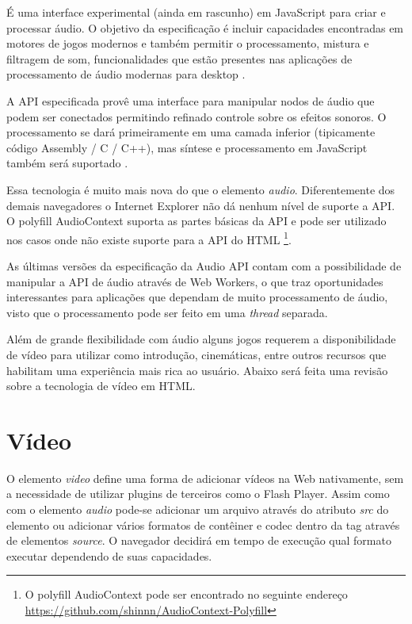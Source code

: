 É uma interface experimental (ainda em rascunho) em JavaScript para
criar e processar áudio. O objetivo da especificação é incluir
capacidades encontradas em motores de jogos modernos e também permitir
o processamento, mistura e filtragem de som, funcionalidades que estão
presentes nas aplicações de processamento de áudio modernas para
desktop \autocite{audioApiSpec}.

A API especificada provê uma interface para manipular nodos de
áudio que podem ser conectados permitindo refinado controle sobre os
efeitos sonoros. O processamento se dará primeiramente em uma camada
inferior (tipicamente código Assembly / C / C++), mas síntese e
processamento em JavaScript também será suportado \autocite{audioApiSpec}.

Essa tecnologia é muito mais nova do que o elemento \textit{audio}.
Diferentemente dos demais navegadores o Internet Explorer não
dá nenhum nível de suporte a API. O polyfill AudioContext
suporta as partes básicas da API e pode ser utilizado nos
casos onde não existe suporte para a API do HTML \footnote{O
polyfill AudioContext pode ser encontrado no seguinte endereço
\url{https://github.com/shinnn/AudioContext-Polyfill}}.

As últimas versões da especificação da Audio API contam com a
possibilidade de manipular a API de áudio através de Web Workers, o
que traz oportunidades interessantes para aplicações que dependam de
muito processamento de áudio, visto que o processamento pode ser
feito em uma \textit{thread} separada.

Além de grande flexibilidade com áudio alguns jogos requerem a
disponibilidade de vídeo para utilizar como introdução, cinemáticas,
entre outros recursos que habilitam uma experiência mais rica ao
usuário. Abaixo será feita uma revisão sobre a tecnologia de vídeo
em HTML.

\section{Vídeo}

O elemento \textit{video} define uma forma de adicionar vídeos na
Web nativamente, sem a necessidade de utilizar plugins de terceiros
como o Flash Player. Assim como com o elemento \textit{audio} pode-se
adicionar um arquivo através do atributo \textit{src} do elemento
ou adicionar vários formatos de contêiner e codec dentro da tag
através de elementos \textit{source}. O navegador decidirá em tempo de
execução qual formato executar dependendo de suas capacidades.

